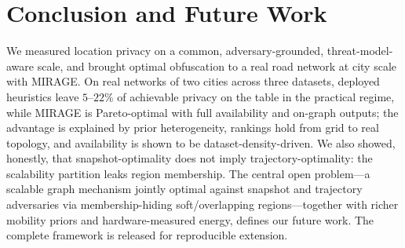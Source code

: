 \documentclass[11pt]{article}
\begin{document}
\section{Conclusion and Future Work}
\label{sec:conclusion}
We measured location privacy on a common, adversary-grounded, threat-model-aware
scale, and brought optimal obfuscation to a real road network at city scale with
MIRAGE. On real networks of two cities across three datasets, deployed heuristics
leave $5$--$22\%$ of achievable privacy on the table in the practical regime,
while MIRAGE is Pareto-optimal with full availability and on-graph outputs; the
advantage is explained by prior heterogeneity, rankings hold from grid to real
topology, and availability is shown to be dataset-density-driven. We also showed,
honestly, that snapshot-optimality does not imply trajectory-optimality: the
scalability partition leaks region membership. The central open problem---a
scalable graph mechanism jointly optimal against snapshot and trajectory
adversaries via membership-hiding soft/overlapping regions---together with richer
mobility priors and hardware-measured energy, defines our future work. The
complete framework is released for reproducible extension.
\end{document}
